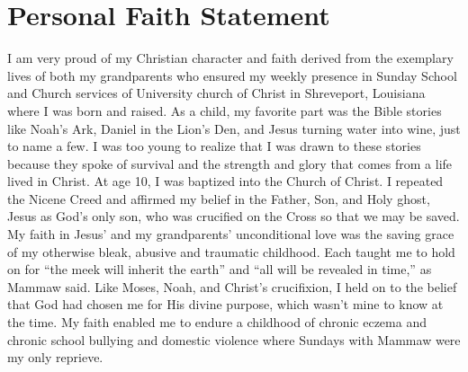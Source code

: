 \documentclass{article}
\begin{document}
\pagestyle{empty}

\section*{Personal Faith Statement}

I am very proud of my Christian character and faith derived from the exemplary lives of both my grandparents who ensured my weekly presence in Sunday School and Church services of University church of Christ in Shreveport, Louisiana where I was born and raised.
As a child, my favorite part was the Bible stories like Noah's Ark, Daniel in the Lion's Den, and Jesus turning water into wine, just to name a few. 
I was too young to realize that I was drawn to these stories because they spoke of survival and the strength and glory that comes from a life lived in Christ.
At age 10, I was baptized into the Church of Christ. I repeated the Nicene Creed and affirmed my belief in the Father, Son, and Holy ghost, Jesus as God’s only son, who was crucified on the Cross so that we may be  saved. 
My faith in Jesus’ and my grandparents’ unconditional love was the saving grace of my otherwise bleak, abusive and traumatic childhood. 
Each taught me to hold on for ``the meek will inherit the earth'' and ``all will be revealed in time,'' as Mammaw said. Like Moses, Noah, and Christ's crucifixion, I held on to the belief that God had chosen me for His divine purpose, which wasn't mine to know at the time. 
My faith enabled me to endure a childhood of chronic eczema and chronic school bullying and domestic violence where Sundays with Mammaw were my only reprieve.
\end{document}
